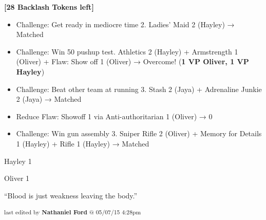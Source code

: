 \textbf{{[}28 Backlash Tokens left{]}}






\begin{itemize}
\item Challenge: Get ready in mediocre time 2.  Ladies' Maid 2 (Hayley) → Matched
\item Challenge: Win 50 pushup test. Athletics 2 (Hayley) + Armstrength 1 (Oliver) +  {\color[RGB]{255,0,0}Flaw: Show off 1}  (Oliver) → Overcome! (\textbf{1 VP Oliver, 1 VP Hayley})
\item Challenge: Beat other team at running 3.  Stash 2 (Jaya) + Adrenaline Junkie 2 (Jaya) → Matched
\item Reduce Flaw: Showoff 1 via Anti-authoritarian 1 (Oliver) → 0
\item Challenge: Win gun assembly 3. Sniper Rifle 2 (Oliver) + Memory for Details 1 (Hayley) + Rifle 1 (Hayley)  → Matched
\end{itemize}



Hayley 1

Oliver 1



``Blood is just weakness leaving the body.''

\vspace{\fill}


\begin{flushright}
\textsubscript{last edited by \textbf{Nathaniel Ford} @ 05/07/15 4:28pm}
\end{flushright}

